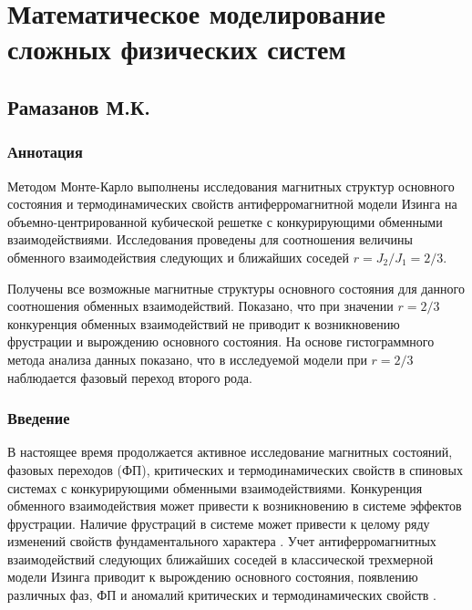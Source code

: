\chapter{Математическое моделирование сложных физических систем}




\section{Рамазанов М.К.}



\subsection{Аннотация}

Методом Монте-Карло выполнены исследования магнитных структур основного состояния и термодинамических свойств антиферромагнитной модели Изинга на объемно-центрированной кубической решетке с конкурирующими обменными взаимодействиями. Исследования проведены для соотношения величины обменного взаимодействия следующих и ближайших соседей $r=J_2/J_1=2/3$.

Получены все возможные магнитные структуры основного состояния для данного соотношения обменных взаимодействий. Показано, что при значении $r=2/3$ конкуренция обменных взаимодействий не приводит к возникновению фрустрации и вырождению основного состояния. На основе гистограммного метода анализа данных показано, что в исследуемой модели при $r=2/3$ наблюдается фазовый переход второго рода.


\subsection{Введение}

В настоящее время продолжается активное исследование магнитных состояний, фазовых переходов (ФП), критических и термодинамических свойств в спиновых системах с конкурирующими обменными взаимодействиями. Конкуренция обменного взаимодействия может привести к возникновению в системе эффектов фрустрации. Наличие фрустраций в системе может привести к целому ряду изменений свойств фундаментального характера \cite{ph1_1,ph1_2,ph1_3}. Учет антиферромагнитных взаимодействий следующих ближайших соседей в классической трехмерной модели Изинга приводит к вырождению основного состояния, появлению различных фаз, ФП и аномалий критических и термодинамических свойств \cite{ph1_4}.


